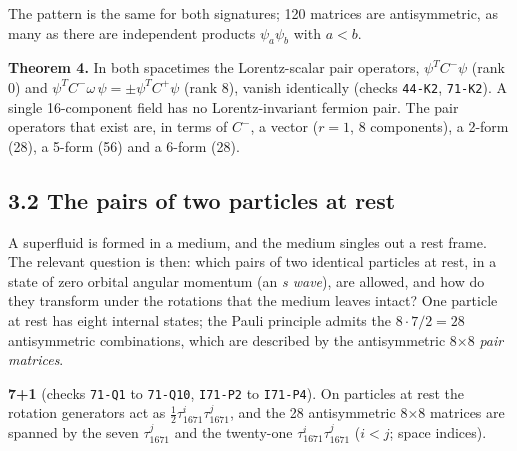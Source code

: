 \documentclass[
  10pt,
]{article}
\begin{document}
The pattern is the same for both signatures; 120 matrices are
antisymmetric, as many as there are independent products
\(\psi_a\psi_b\) with \(a<b\).

\textbf{Theorem 4.} In both spacetimes the Lorentz-scalar pair
operators, \(\psi^TC^{-}\psi\) (rank 0) and
\(\psi^TC^{-}\omega\,\psi=\pm\psi^TC^{+}\psi\) (rank 8), vanish
identically (checks \texttt{44-K2}, \texttt{71-K2}). A single
16-component field has no Lorentz-invariant fermion pair. The pair
operators that exist are, in terms of \(C^{-}\), a vector (\(r=1\), 8
components), a 2-form (28), a 5-form (56) and a 6-form (28).

\hypertarget{the-pairs-of-two-particles-at-rest}{%
\subsection{3.2 The pairs of two particles at
rest}\label{the-pairs-of-two-particles-at-rest}}

A superfluid is formed in a medium, and the medium singles out a rest
frame. The relevant question is then: which pairs of two identical
particles at rest, in a state of zero orbital angular momentum (an
\emph{s wave}), are allowed, and how do they transform under the
rotations that the medium leaves intact? One particle at rest has eight
internal states; the Pauli principle admits the \(8\cdot7/2=28\)
antisymmetric combinations, which are described by the antisymmetric 8×8
\emph{pair matrices}.

\textbf{7+1} (checks \texttt{71-Q1} to \texttt{71-Q10}, \texttt{I71-P2}
to \texttt{I71-P4}). On particles at rest the rotation generators act as
\(\frac12\tau_{1671}^i\tau_{1671}^j\), and the 28 antisymmetric 8×8
matrices are spanned by the seven \(\tau_{1671}^j\) and the twenty-one
\(\tau_{1671}^i\tau_{1671}^j\) (\(i<j\); space indices).
\end{document}

